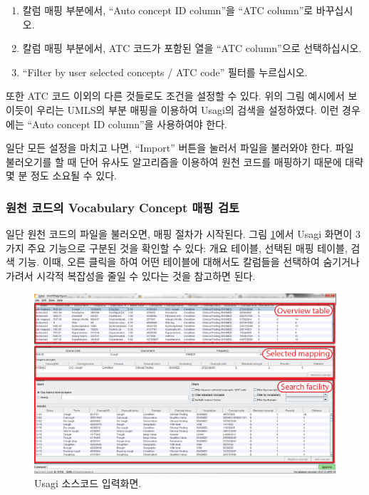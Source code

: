 \documentclass[11pt]{book}
\providecommand{\tightlist}{%
  \setlength{\itemsep}{0pt}\setlength{\parskip}{0pt}}
\theoremstyle{definition}
\theoremstyle{definition}
\theoremstyle{definition}
\theoremstyle{remark}
\begin{document}
\begin{enumerate}
\def\labelenumi{\arabic{enumi}.}
\tightlist
\item
  칼럼 매핑 부분에서, ``Auto concept ID column''을 ``ATC column''로
  바꾸십시오.
\item
  칼럼 매핑 부분에서, ATC 코드가 포함된 열을 ``ATC column''으로
  선택하십시오.
\item
  ``Filter by user selected concepts / ATC code'' 필터를 누르십시오.
\end{enumerate}

또한 ATC 코드 이외의 다른 것들로도 조건을 설정할 수 있다. 위의 그림
예시에서 보이듯이 우리는 UMLS의 부분 매핑을 이용하여 Usagi의 검색을
설정하였다. 이런 경우에는 ``Auto concept ID column''을 사용하여야 한다.

일단 모든 설정을 마치고 나면, ``Import'' 버튼을 눌러서 파일을 불러와야
한다. 파일 불러오기를 할 때 단어 유사도 알고리즘을 이용하여 원천 코드를
매핑하기 때문에 대략 몇 분 정도 소요될 수 있다.

\subsubsection*{원천 코드의 Vocabulary Concept 매핑
검토}\label{--vocabulary-concept--}

일단 원천 코드의 파일을 불러오면, 매핑 절차가 시작된다. 그림
\ref{fig:usagiOverview}에서 Usagi 화면이 3가지 주요 기능으로 구분된 것을
확인할 수 있다: 개요 테이블, 선택된 매핑 테이블, 검색 기능. 이때, 오른
클릭을 하여 어떤 테이블에 대해서도 칼럼들을 선택하여 숨기거나 가려서
시각적 복잡성을 줄일 수 있다는 것을 참고하면 된다.

\begin{figure}

{\centering \includegraphics[width=1\linewidth]{images/ExtractTransformLoad/usagiOverview} 

}

\caption{Usagi 소스코드 입력화면.}\label{fig:usagiOverview}
\end{figure}
\end{document}
